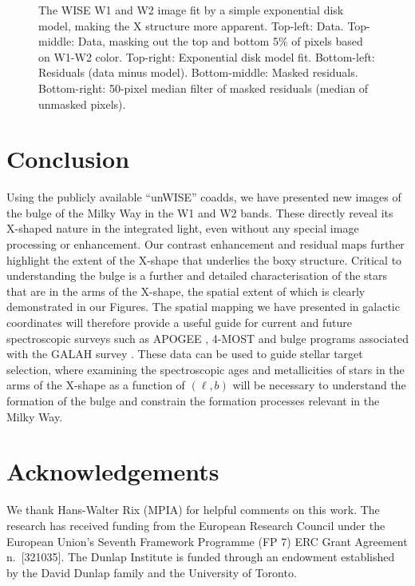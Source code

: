 \documentclass[12pt, preprint]{aastex}
\begin{document}
\begin{figure}[h!]
\caption{%
  The WISE W1 and W2 image fit by a simple exponential disk
  model, making the X structure more apparent.
  Top-left: Data.  Top-middle: Data, masking out the top and bottom 5\%
  of pixels based on W1-W2 color.  Top-right: Exponential disk model fit.
  Bottom-left: Residuals (data minus model).  Bottom-middle: Masked residuals.
  Bottom-right: 50-pixel median filter of masked residuals (median of unmasked
  pixels).
  }
\label{fig:modfit}
\end{figure}




\section{Conclusion}

Using the publicly available ``unWISE'' coadds, we have presented new images of the bulge of the Milky Way in the W1 and W2 bands.  These directly reveal its X-shaped nature in the integrated light, even without any special image processing or enhancement. Our contrast enhancement and residual maps further highlight the extent of the X-shape that underlies the boxy structure. Critical to understanding the bulge is a further and detailed characterisation of the stars that are in the arms of the X-shape, the spatial extent of which is clearly demonstrated in our Figures. The spatial mapping we have presented in galactic coordinates will therefore provide a useful guide for current and future spectroscopic surveys such as APOGEE \citep{Majewski2015}, 4-MOST \citep{4most} and bulge programs associated with the GALAH survey \citep{deSilva2015}. These data can be used to guide stellar target selection, where examining the spectroscopic ages \citep[e.g.][]{Martig2016, Ness2016} and metallicities of stars in the arms of the X-shape as a function of $(\ell,b)$ will be necessary to understand the formation of the bulge and constrain the formation processes relevant in the Milky Way. 


\section{Acknowledgements} 
We thank Hans-Walter Rix (MPIA) for helpful comments on this work. 
The research has received funding from the European Research Council under the European Union's Seventh Framework Programme (FP 7) ERC Grant Agreement n.~[321035].
%
The Dunlap Institute is funded through an endowment established by the David Dunlap family and the University of Toronto.


\end{document}
